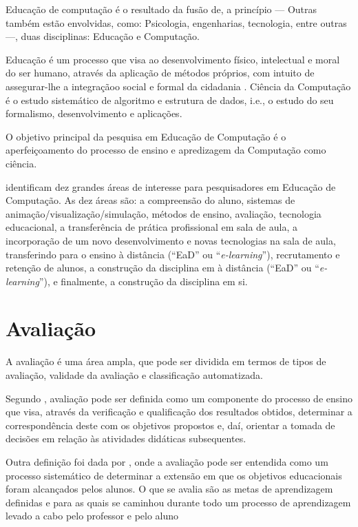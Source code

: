 \documentclass[
	12pt,				%
	openright,			%
	oneside,
	a4paper,			%
	english,			%
	french,				%
	spanish,			%
	brazil,				%
	]{abntex2}
\begin{document}
Educação de computação é o resultado da fusão de, a princípio --- Outras também estão envolvidas, como: Psicologia, engenharias, tecnologia, entre outras ---, duas disciplinas: Educação e Computação. 

Educação é um processo que visa ao desenvolvimento físico, intelectual e moral do ser humano, através da aplicação de métodos próprios, com intuito de assegurar-lhe a integraçãoo social e formal da cidadania \cite{weiszflog1999michaelis}. Ciência da Computação é o estudo sistemático de algoritmo e estrutura de dados, i.e., o estudo do seu formalismo, desenvolvimento e aplicações. \cite{gibbs1986model}

O objetivo principal da pesquisa em Educação de Computação é o aperfeiçoamento do processo de ensino e apredizagem da Computação como ciência. \cite{holmboe2001research}

 identificam dez grandes áreas de interesse para pesquisadores em Educação de Computação. As dez áreas são: a compreensão do aluno, sistemas de animação/visualização/simulação, métodos de ensino, avaliação, tecnologia educacional, a transferência de prática profissional em sala de aula, a incorporação de um novo desenvolvimento e novas tecnologias na sala de aula, transferindo para o ensino à distância (“EaD” ou “\textit{e-learning}”), recrutamento e retenção de alunos, a construção da disciplina em à distância (“EaD” ou “\textit{e-learning}”), e finalmente, a construção da disciplina em si. 


\section{Avaliação}
\label{sec:AVA}
A avaliação é uma área ampla, que pode ser dividida em termos de tipos de avaliação, validade da avaliação e classificação automatizada. \cite{fincher2005mapping}

Segundo , avaliação pode ser definida como um componente do processo de ensino que visa, através da verificação e qualificação dos resultados obtidos, determinar a correspondência  deste com os objetivos propostos e, daí, orientar a tomada de decisões em relação às atividades didáticas subsequentes.

Outra definição foi dada por , onde a avaliação pode ser entendida como um processo sistemático de determinar a extensão em que os objetivos educacionais foram alcançados pelos alunos. O que se avalia são as metas de aprendizagem definidas e para as quais se caminhou durante todo um processo de aprendizagem levado a cabo pelo professor e pelo aluno
\end{document}
